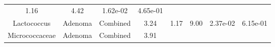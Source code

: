 \documentclass[12pt,]{article}
\begin{document}
\begin{longtable}[]{@{}cccccccc@{}}
\begin{minipage}[t]{0.14\columnwidth}
1.16\strut
\end{minipage} & \begin{minipage}[t]{0.14\columnwidth}\centering\strut
4.42\strut
\end{minipage} & \begin{minipage}[t]{0.06\columnwidth}\centering\strut
1.62e-02\strut
\end{minipage} & \begin{minipage}[t]{0.06\columnwidth}\centering\strut
4.65e-01\strut
\end{minipage}\tabularnewline
\begin{minipage}[t]{0.18\columnwidth}\centering\strut
Lactococcus\strut
\end{minipage} & \begin{minipage}[t]{0.07\columnwidth}\centering\strut
Adenoma\strut
\end{minipage} & \begin{minipage}[t]{0.09\columnwidth}\centering\strut
Combined\strut
\end{minipage} & \begin{minipage}[t]{0.03\columnwidth}\centering\strut
3.24\strut
\end{minipage} & \begin{minipage}[t]{0.14\columnwidth}\centering\strut
1.17\strut
\end{minipage} & \begin{minipage}[t]{0.14\columnwidth}\centering\strut
9.00\strut
\end{minipage} & \begin{minipage}[t]{0.06\columnwidth}\centering\strut
2.37e-02\strut
\end{minipage} & \begin{minipage}[t]{0.06\columnwidth}\centering\strut
6.15e-01\strut
\end{minipage}\tabularnewline
\begin{minipage}[t]{0.18\columnwidth}\centering\strut
Micrococcaceae\strut
\end{minipage} & \begin{minipage}[t]{0.07\columnwidth}\centering\strut
Adenoma\strut
\end{minipage} & \begin{minipage}[t]{0.09\columnwidth}\centering\strut
Combined\strut
\end{minipage} & \begin{minipage}[t]{0.03\columnwidth}\centering\strut
3.91\strut
\end{minipage} & \begin{minipage}[t]{0.14\columnwidth}\centering\strut

\end{minipage}
\end{longtable}
\end{document}

